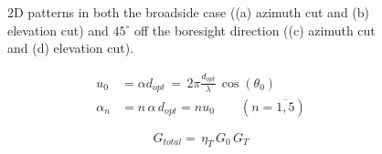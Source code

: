 \documentclass[12pt,a4paper]{article}
\begin{document}
{\begin{figure}
\begin{center}
\begin{subfigure}{0.25\linewidth}
	\caption{}
\end{subfigure}
\caption{2D patterns in both the broadside case ((a) azimuth cut and (b) elevation cut) and $45^\circ$ off the boresight direction ((c) azimuth cut and (d) elevation cut).}
\label{fig:pcb pifa array comparison}
	\end{center}
\end{figure}
\begin{equation}
	\begin{aligned}
		u_0&=\alpha d_{opt}\,=\,2\pi\frac{d_{opt}}{\lambda}\,\cos(\theta_0)\\
		\alpha_n&=n\,\alpha\,d_{opt}=nu_0\qquad \left(n=\overline{1,5}\right)
		\label{eq:phase coefficients}
	\end{aligned}
\end{equation}

\begin{equation}
	G_{total}=\,\eta_T\,G_0\,G_T
	\label{eq:pattern multiplication}
\end{equation}




\newpage 

\printbibliography

}
\end{document}
